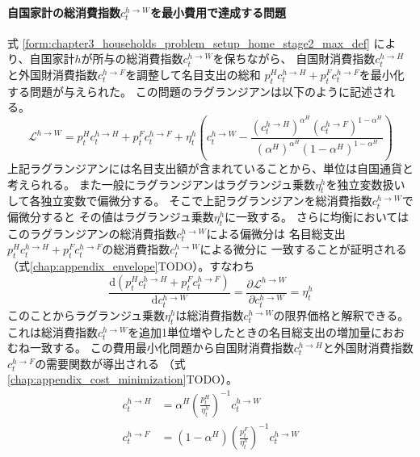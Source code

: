 \paragraph{自国家計の総消費指数\(c_t^{h\to W}\)を最小費用で達成する問題}
\label{sec:chapter3_households_stage1b_home_c_h_W_problem}
式
\eqref{form:chapter3_households_problem_setup_home_stage2_max_def}
により、自国家計\(h\)が所与の総消費指数\(c_t^{h\to W}\)を保ちながら、
自国財消費指数\(c_t^{h\to H}\)と外国財消費指数\(c_t^{h\to F}\)を調整して名目支出の総和
\(p_t^Hc_t^{h\to H}+p_t^Fc_t^{h\to F}\)を最小化する問題が与えられた。
この問題のラグランジアンは以下のように記述される。
\begin{equation}
\label{form:chapter3_households_stage1b_home_c_h_W_problem_lagrangian_def}
    \mathcal{L}^{h\to W}=p_t^Hc_t^{h\to H}+p_t^Fc_t^{h\to F}+\eta_t^h\left(c_t^{h\to W}-\frac{(c_t^{h\to H})^{\alpha^H}(c_t^{h\to F})^{1-\alpha^H}}{(\alpha^H)^{\alpha^H}(1-\alpha^H)^{1-\alpha^H}}\right)
\end{equation}
上記ラグランジアンには名目支出額が含まれていることから、単位は自国通貨と考えられる。
また一般にラグランジアンはラグランジュ乗数\(\eta_t^h\)を独立変数扱いして各独立変数で偏微分する。
そこで上記ラグランジアンを総消費指数\(c_t^{h\to W}\)で偏微分すると
その値はラグランジュ乗数\(\eta_t^h\)に一致する。
さらに均衡においてはこのラグランジアンの総消費指数\(c_t^{h\to W}\)による偏微分は
名目総支出\(p_t^Hc_t^{h\to H}+p_t^Fc_t^{h\to F}\)の総消費指数\(c_t^{h\to W}\)による微分に
一致することが証明される（式\eqref{chap:appendix_envelope}TODO）。すなわち
\begin{equation}
\label{form:chapter3_households_stage1b_home_c_h_W_problem_eta_h_marginal_eq}
    \frac{\mathrm{d}(p_t^Hc_t^{h\to H}+p_t^Fc_t^{h\to F})}{\mathrm{d}c_t^{h\to W}}=\frac{\partial \mathcal{L}^{h\to W}}{\partial c_t^{h\to W}}=\eta_t^h
\end{equation}
このことからラグランジュ乗数\(\eta_t^h\)は総消費指数\(c_t^{h\to W}\)の限界価格と解釈できる。
これは総消費指数\(c_t^{h\to W}\)を追加1単位増やしたときの名目総支出の増加量におおむね一致する。
この費用最小化問題から自国財消費指数\(c_t^{h\to H}\)と外国財消費指数\(c_t^{h\to F}\)の需要関数が導出される
（式\eqref{chap:appendix_cost_minimization}TODO）。
\begin{align}
    \label{form:chapter3_households_stage1b_home_c_h_W_problem_c_h_H_eq}
        c_t^{h\to H}&=\alpha^H\left(\frac{p_t^H}{\eta_t^h}\right)^{-1}c_t^{h\to W} \\
    \label{form:chapter3_households_stage1b_home_c_h_W_problem_c_h_F_eq}
        c_t^{h\to F}&=(1-\alpha^H)\left(\frac{p_t^F}{\eta_t^h}\right)^{-1}c_t^{h\to W}
\end{align}
